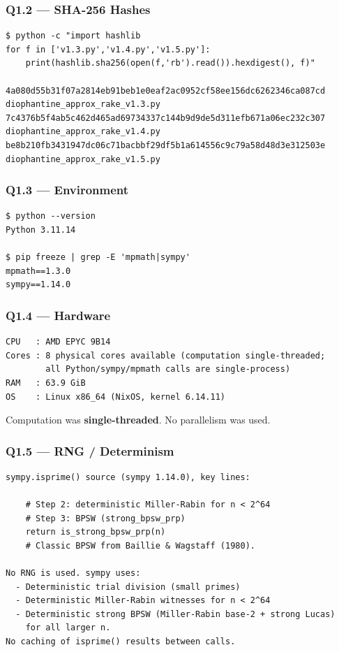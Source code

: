 \documentclass[11pt,a4paper]{article}
\begin{document}
\subsubsection*{Q1.2 --- SHA-256 Hashes}

\begin{lstlisting}
$ python -c "import hashlib
for f in ['v1.3.py','v1.4.py','v1.5.py']:
    print(hashlib.sha256(open(f,'rb').read()).hexdigest(), f)"

4a080d55b31f07a2814eb91beb1e0eaf2ac0952cf58ee156dc6262346ca087cd  diophantine_approx_rake_v1.3.py
7c4376b5f4ab5c462d465ad69734337c144b9d9de5d311efb671a06ec232c307  diophantine_approx_rake_v1.4.py
be8b210fb3431947dc06c71bacbbf29df5b1a614556c9c79a58d48d3e312503e  diophantine_approx_rake_v1.5.py
\end{lstlisting}

\subsubsection*{Q1.3 --- Environment}

\begin{lstlisting}
$ python --version
Python 3.11.14

$ pip freeze | grep -E 'mpmath|sympy'
mpmath==1.3.0
sympy==1.14.0
\end{lstlisting}

\subsubsection*{Q1.4 --- Hardware}

\begin{lstlisting}
CPU   : AMD EPYC 9B14
Cores : 8 physical cores available (computation single-threaded;
        all Python/sympy/mpmath calls are single-process)
RAM   : 63.9 GiB
OS    : Linux x86_64 (NixOS, kernel 6.14.11)
\end{lstlisting}

Computation was \textbf{single-threaded}. No parallelism was used.

\subsubsection*{Q1.5 --- RNG / Determinism}

\begin{lstlisting}
sympy.isprime() source (sympy 1.14.0), key lines:

    # Step 2: deterministic Miller-Rabin for n < 2^64
    # Step 3: BPSW (strong_bpsw_prp)
    return is_strong_bpsw_prp(n)
    # Classic BPSW from Baillie & Wagstaff (1980).

No RNG is used. sympy uses:
  - Deterministic trial division (small primes)
  - Deterministic Miller-Rabin witnesses for n < 2^64
  - Deterministic strong BPSW (Miller-Rabin base-2 + strong Lucas)
    for all larger n.
No caching of isprime() results between calls.
\end{lstlisting}
\end{document}
